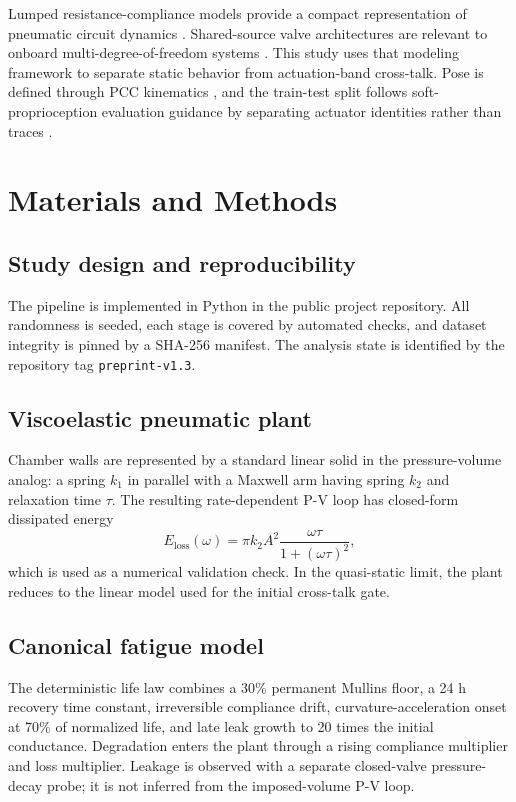 \documentclass[preprints,article,submit,oneauthor]{Definitions/mdpi}
\begin{document}
Lumped resistance-compliance models provide a compact representation of pneumatic circuit dynamics \citep{stanley2021}. Shared-source valve architectures are relevant to onboard multi-degree-of-freedom systems \citep{mcdonald2021,moran2024}. This study uses that modeling framework to separate static behavior from actuation-band cross-talk. Pose is defined through PCC kinematics \citep{webster2010}, and the train-test split follows soft-proprioception evaluation guidance by separating actuator identities rather than traces \citep{zhang2023}.

\section{Materials and Methods}

\subsection{Study design and reproducibility}

The pipeline is implemented in Python in the public project repository. All randomness is seeded, each stage is covered by automated checks, and dataset integrity is pinned by a SHA-256 manifest. The analysis state is identified by the repository tag \texttt{preprint-v1.3}.

\subsection{Viscoelastic pneumatic plant}

Chamber walls are represented by a standard linear solid in the pressure-volume analog: a spring $k_1$ in parallel with a Maxwell arm having spring $k_2$ and relaxation time $\tau$. The resulting rate-dependent P-V loop has closed-form dissipated energy
\begin{equation}
E_{\mathrm{loss}}(\omega)=\pi k_2 A^2\frac{\omega\tau}{1+(\omega\tau)^2},
\end{equation}
which is used as a numerical validation check. In the quasi-static limit, the plant reduces to the linear model used for the initial cross-talk gate.

\subsection{Canonical fatigue model}

The deterministic life law combines a 30\% permanent Mullins floor, a 24 h recovery time constant, irreversible compliance drift, curvature-acceleration onset at 70\% of normalized life, and late leak growth to 20 times the initial conductance. Degradation enters the plant through a rising compliance multiplier and loss multiplier. Leakage is observed with a separate closed-valve pressure-decay probe; it is not inferred from the imposed-volume P-V loop.
\end{document}
